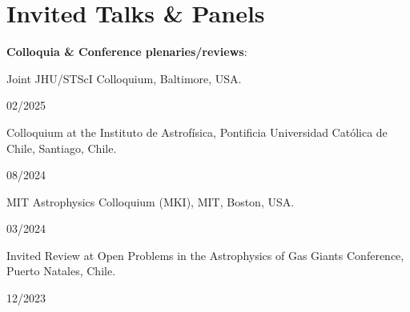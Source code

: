 \documentclass[12pt, a4paper]{article} %
\begin{document}
\section*{Invited Talks \& Panels}

\textbf{Colloquia \& Conference plenaries/reviews}:\\

\begin{minipage}[t]{0.7\textwidth}
\begin{flushleft}%
  \setlength{\leftskip}{0.2cm}%
Joint JHU/STScI Colloquium, Baltimore, USA.
\end{flushleft}
\end{minipage}
\begin{minipage}[t]{0.3\textwidth}
\hfill 02/2025
\end{minipage}
\vspace{0.2cm}

\begin{minipage}[t]{0.7\textwidth}
\begin{flushleft}%
  \setlength{\leftskip}{0.2cm}%
Colloquium at the Instituto de Astrof\'isica, Pontificia Universidad Cat\'olica de Chile, Santiago, Chile.
\end{flushleft}
\end{minipage}
\begin{minipage}[t]{0.3\textwidth}
\hfill 08/2024
\end{minipage}
\vspace{0.2cm}

\begin{minipage}[t]{0.7\textwidth}
\begin{flushleft}%
  \setlength{\leftskip}{0.2cm}%
MIT Astrophysics Colloquium (MKI), MIT, Boston, USA.
\end{flushleft}
\end{minipage}
\begin{minipage}[t]{0.3\textwidth}
\hfill 03/2024
\end{minipage}
\vspace{0.2cm}

\begin{minipage}[t]{0.7\textwidth}
\begin{flushleft}%
  \setlength{\leftskip}{0.2cm}%
Invited Review at Open Problems in the Astrophysics of Gas Giants Conference, Puerto Natales, Chile.
\end{flushleft}
\end{minipage}
\begin{minipage}[t]{0.3\textwidth}
\hfill 12/2023
\end{minipage}
\vspace{0.2cm}
\end{document}

